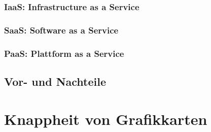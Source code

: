 \documentclass[12pt,toc=bib,toc=listof]{scrreprt}
\begin{document}

\subsection{IaaS: Infrastructure as a Service}
\label{sec:IaaS: Infrastructure as a Service}


\subsection{SaaS: Software as a Service}
\label{sec:SaaS: Software as a Service}


\subsection{PaaS: Plattform as a Service}
\label{sec:PaaS: Plattform as a Service}


\section{Vor- und Nachteile}
\label{Vor- und Nachteile}

\chapter{Knappheit von Grafikkarten} %
\label{sec:Knappheit von Grafikkarten}
\end{document}
